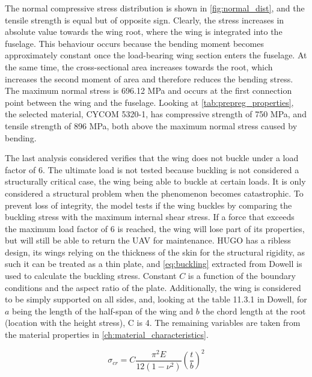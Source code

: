 The normal compressive stress distribution is shown in \autoref{fig:normal_dist}, and the tensile strength is equal but of opposite sign. Clearly, the stress increases in absolute value towards the wing root, where the wing is integrated into the fuselage. This behaviour occurs because the bending moment becomes approximately constant once the load-bearing wing section enters the fuselage. At the same time, the cross-sectional area increases towards the root, which increases the second moment of area and therefore reduces the bending stress. The maximum normal stress is 696.12 MPa and occurs at the first connection point between the wing and the fuselage. Looking at \autoref{tab:prepreg_properties}, the selected material, CYCOM 5320-1, has compressive strength of 750 MPa, and tensile strength of 896 MPa, both above the maximum normal stress caused by bending.

The last analysis considered verifies that the wing does not buckle under a load factor of 6. The ultimate load is not tested because buckling is not considered a structurally critical case, the wing being able to buckle at certain loads. It is only considered a structural problem when the phenomenon becomes catastrophic.  To prevent loss of integrity, the model tests if the wing buckles by comparing the buckling stress with the maximum internal shear stress. If a force that exceeds the maximum load factor of 6 is reached, the wing will lose part of its properties, but will still be able to return the UAV for maintenance. 
HUGO has a ribless design, its wings relying on the thickness of the skin for the structural rigidity, as such it can be treated as a thin plate, and \autoref{eq:buckling} extracted from Dowell\cite[p.~458]{niu1999airframe} is used to calculate the buckling stress. Constant $C$ is a function of the boundary conditions and the aspect ratio of the plate. Additionally, the wing is considered to be simply supported on all sides, and, looking at the table 11.3.1 in Dowell\cite[p.~458]{niu1999airframe}, for $a$ being the length of the half-span of the wing and $b$ the chord length at the root (location with the height stress), C is 4. The remaining variables are taken from the material properties in \autoref{ch:material_characteristics}.


\begin{equation}
    \sigma_{cr} = C \frac{\pi^2 E}{12(1-\nu^2)} \left(\frac{t}{b}\right)^2
    \label{eq:buckling}
\end{equation}

